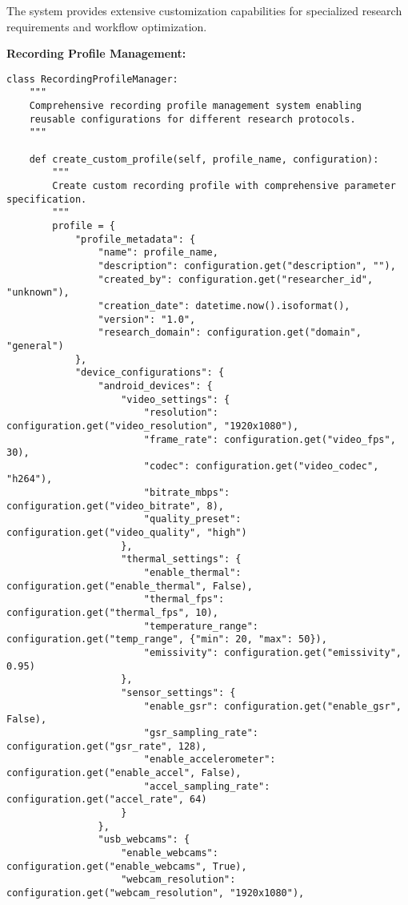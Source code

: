 \documentclass[11pt,a4paper]{article}
\begin{document}
The system provides extensive customization capabilities for specialized research requirements and workflow
optimization.

\textbf{Recording Profile Management:}

\begin{verbatim}
class RecordingProfileManager:
    """
    Comprehensive recording profile management system enabling
    reusable configurations for different research protocols.
    """

    def create_custom_profile(self, profile_name, configuration):
        """
        Create custom recording profile with comprehensive parameter specification.
        """
        profile = {
            "profile_metadata": {
                "name": profile_name,
                "description": configuration.get("description", ""),
                "created_by": configuration.get("researcher_id", "unknown"),
                "creation_date": datetime.now().isoformat(),
                "version": "1.0",
                "research_domain": configuration.get("domain", "general")
            },
            "device_configurations": {
                "android_devices": {
                    "video_settings": {
                        "resolution": configuration.get("video_resolution", "1920x1080"),
                        "frame_rate": configuration.get("video_fps", 30),
                        "codec": configuration.get("video_codec", "h264"),
                        "bitrate_mbps": configuration.get("video_bitrate", 8),
                        "quality_preset": configuration.get("video_quality", "high")
                    },
                    "thermal_settings": {
                        "enable_thermal": configuration.get("enable_thermal", False),
                        "thermal_fps": configuration.get("thermal_fps", 10),
                        "temperature_range": configuration.get("temp_range", {"min": 20, "max": 50}),
                        "emissivity": configuration.get("emissivity", 0.95)
                    },
                    "sensor_settings": {
                        "enable_gsr": configuration.get("enable_gsr", False),
                        "gsr_sampling_rate": configuration.get("gsr_rate", 128),
                        "enable_accelerometer": configuration.get("enable_accel", False),
                        "accel_sampling_rate": configuration.get("accel_rate", 64)
                    }
                },
                "usb_webcams": {
                    "enable_webcams": configuration.get("enable_webcams", True),
                    "webcam_resolution": configuration.get("webcam_resolution", "1920x1080"),

\end{verbatim}
\end{document}
